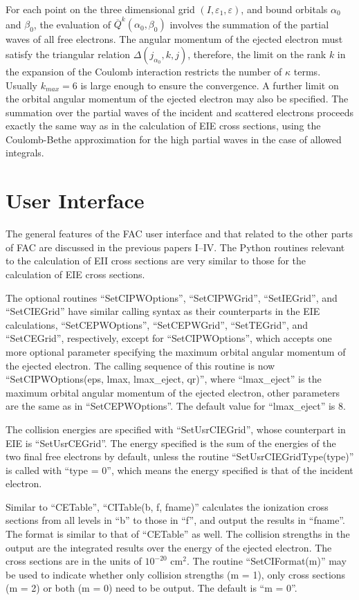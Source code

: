 \documentclass{elsart}
\begin{document}
For each point on the three dimensional grid $(I,\varepsilon_1, \varepsilon)$,
and bound orbitals $\alpha_0$ and $\beta_0$, the evaluation of
$\overline{Q}^k(\alpha_0,\beta_0)$ involves the summation of the 
partial waves of all free electrons. The angular momentum of the ejected
electron must satisfy the triangular relation $\Delta(j_{\alpha_0}, k, j)$,
therefore, the limit on the rank $k$ in the expansion of the Coulomb
interaction restricts the number of $\kappa$ terms. Usually $k_{max} = 6$ is
large enough to ensure the convergence. A further limit on the orbital angular
momentum of 
the ejected electron may also be specified. The summation over the partial
waves of the incident and scattered electrons proceeds exactly the same way as
in the calculation of EIE cross sections, using the Coulomb-Bethe
approximation for the high partial waves in the case of allowed integrals.

\section{User Interface}
\label{sec_program}
The general features of the FAC user interface and that related to the other
parts of FAC are discussed in the previous papers
I--IV\citep{gu01a,gu01b,gu01c,gu01d}. The Python routines relevant to the
calculation of EII cross 
sections are very similar to those for the calculation of EIE cross sections. 

The optional routines ``SetCIPWOptions'', ``SetCIPWGrid'', ``SetIEGrid'', and
``SetCIEGrid'' have similar calling syntax as their counterparts in the EIE
calculations, ``SetCEPWOptions'', ``SetCEPWGrid'', ``SetTEGrid'', and
``SetCEGrid'', respectively, except for ``SetCIPWOptions'', which accepts one
more optional parameter specifying the maximum orbital angular
momentum of the ejected electron. The calling sequence of this routine is now
``SetCIPWOptions(eps, lmax, lmax\_eject, qr)'', where ``lmax\_eject'' is the
maximum orbital angular momentum of the ejected electron, other parameters are
the same as in ``SetCEPWOptions''. The default value for ``lmax\_eject'' is 8. 

The collision energies are specified with ``SetUsrCIEGrid'', whose counterpart
in EIE is ``SetUsrCEGrid''. The energy specified is the sum of the energies of
the two final free electrons by default, unless the routine
``SetUsrCIEGridType(type)'' is called with ``type = 0'', which means the
energy specified is that of the incident electron. 

Similar to ``CETable'', ``CITable(b, f, fname)'' calculates the
ionization cross sections from all levels in ``b'' to those in ``f'',
and output the results in ``fname''. The format is similar to that of
``CETable'' as well. The collision strengths in the output are 
the integrated results over the energy of the ejected electron. The cross
sections are in the units of $10^{-20}$ cm$^2$. The routine ``SetCIFormat(m)''
may be used to indicate whether only collision strengths (m = 1), only cross
sections (m = 2) or both (m = 0) need to be output. The default is ``m = 0''.
\end{document}
